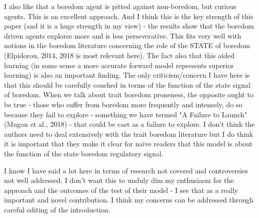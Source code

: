 \documentclass[utf8]{article}
\newenvironment{reply}  
    {\color{Blue}\noindent\newline}
    {\newline}
\begin{document}
        
        
        I also like that a boredom agent is pitted against non-boredom, but curious agents. This is an excellent approach. And I think this is the key strength of this paper (and it is a huge strength in my view) - the results show that the boredom driven agents explores more and is less perseverative. This fits very well with notions in the boredom literature concerning the role of the STATE of boredom (Elpidorou, 2014, 2018 is most relevant here). The fact also that this aided learning (in some sense a more accurate forward model represents superior learning) is also an important finding. The only criticism/concern I have here is that this should be carefully couched in terms of the function of the state signal of boredom. When we talk about trait boredom proneness, the opposite ought to be true - those who suffer from boredom more frequently and intensely, do so because they fail to explore - something we have termed "A Failure to Launch" (Mugon et al., 2018) - that could be cast as a failure to explore. I don't think the authors need to deal extensively with the trait boredom literature but I do think it is important that they make it clear for naive readers that this model is about the function of the state boredom regulatory signal.
        
        \begin{reply}
            \cite{mugon2018failure, Elpidorou.2018, Elpidorou2014}
        \end{reply}
        
        
        I know I have said a lot here in terms of research not covered and controversies not well addressed. I don't want this to unduly dim my enthusiasm for the approach and the outcomes of the test of their model - I see that as a really important and novel contribution. I think my concerns can be addressed through careful editing of the introduction.


    
    	
\end{document}
